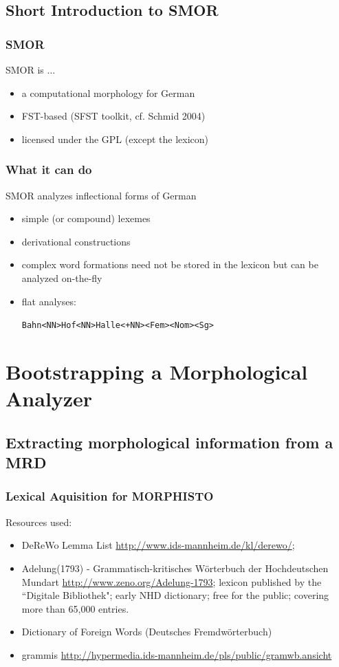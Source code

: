 \documentclass {beamer}
\begin{document}
\subsection{Short Introduction to SMOR}
\frame
{
  \frametitle{SMOR}

SMOR is ...
  \begin{itemize}
  \item a computational morphology for German
  \item FST-based (SFST toolkit, cf. Schmid 2004)
  \item licensed under the GPL (except the lexicon)
  \end{itemize}
}

\frame
{
  \frametitle{What it can do}
SMOR analyzes inflectional forms of German
  \begin{itemize}
  \item<1->{simple (or compound) lexemes}
  \item<2->{derivational constructions}
  \item<3->{complex word formations need not be stored in the lexicon but can be analyzed on-the-fly}
  \item<4->{flat analyses:}
  \begin{alltt}
    Bahn<NN>Hof<NN>Halle<+NN><Fem><Nom><Sg>
  \end{alltt}
  \end{itemize}
}

\section{Bootstrapping a Morphological Analyzer}
\subsection{Extracting morphological information from a MRD}
\frame
{
  \frametitle{Lexical Aquisition for MORPHISTO}
Resources used:
\begin{itemize}
\item DeReWo Lemma List \url{http://www.ids-mannheim.de/kl/derewo/}; 
\item Adelung(1793) - Grammatisch-kritisches Wörterbuch der Hochdeutschen Mundart\newline 
\url{http://www.zeno.org/Adelung-1793}; lexicon published by the ``Digitale Bibliothek"; early NHD dictionary;
free for the public; covering more than 65,000 entries.
\item Dictionary of Foreign Words (Deutsches Fremdwörterbuch)
\item grammis 
\url{http://hypermedia.ids-mannheim.de/pls/public/gramwb.ansicht}
\end{itemize}
}
\end{document}
